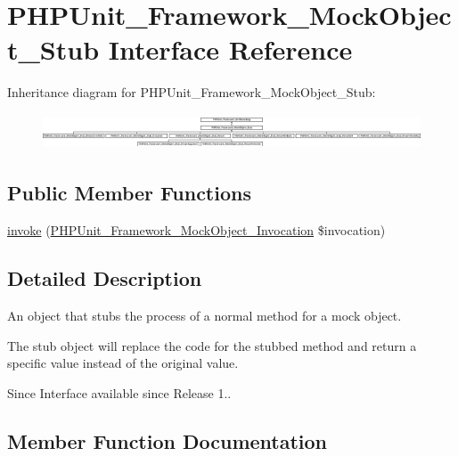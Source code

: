 \hypertarget{interface_p_h_p_unit___framework___mock_object___stub}{}\section{P\+H\+P\+Unit\+\_\+\+Framework\+\_\+\+Mock\+Object\+\_\+\+Stub Interface Reference}
\label{interface_p_h_p_unit___framework___mock_object___stub}
Inheritance diagram for P\+H\+P\+Unit\+\_\+\+Framework\+\_\+\+Mock\+Object\+\_\+\+Stub\+:\begin{figure}[H]
\begin{center}
\leavevmode
\includegraphics[height=1.072797cm]{interface_p_h_p_unit___framework___mock_object___stub}
\end{center}
\end{figure}
\subsection*{Public Member Functions}
\begin{DoxyCompactItemize}
\item 
\mbox{\hyperlink{interface_p_h_p_unit___framework___mock_object___stub_af2fc26e6704e08d95f2ea1d9c5ffb865}{invoke}} (\mbox{\hyperlink{interface_p_h_p_unit___framework___mock_object___invocation}{P\+H\+P\+Unit\+\_\+\+Framework\+\_\+\+Mock\+Object\+\_\+\+Invocation}} \$invocation)
\end{DoxyCompactItemize}


\subsection{Detailed Description}
An object that stubs the process of a normal method for a mock object.

The stub object will replace the code for the stubbed method and return a specific value instead of the original value.

\begin{DoxySince}{Since}
Interface available since Release 1.. 
\end{DoxySince}


\subsection{Member Function Documentation}
\mbox{\label{interface_p_h_p_unit___framework___mock_object___stub_af2fc26e6704e08d95f2ea1d9c5ffb865}} 
